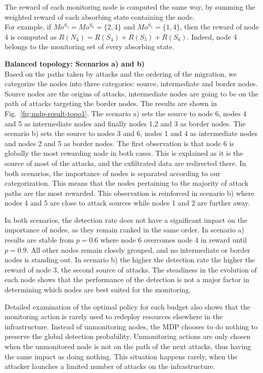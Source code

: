 The reward of each monitoring node is computed the same way, by summing the weighted reward of each absorbing state containing the node.\\
For example, if $Mo^{S_4} = Mo^{S_6} =\{2,4\}$ and $Mo^{S_5} = \{1,4\}$, then the reward of node 4 is computed as $R(N_4) = R(S_4) + R(S_5) + R(S_6)$. Indeed, node 4 belongs to the monitoring set of every absorbing state.



\textbf{Balanced topology: Scenarios a) and b)\\}
Based on the paths taken by attacks and the ordering of the migration, we categorize the nodes into three categories: source, intermediate and border nodes. Source nodes are the origins of attacks, intermediate nodes are going to be on the path of attacks targeting the border nodes. 
The results are shown in Fig.~\ref{fig:mdp-result-topo1}.
The scenario a) sets the source to node 6, nodes 4 and 5 as intermediate nodes and finally nodes 1,2 and 3 as border nodes.
The scenario b) sets the source to nodes 3 and 6, nodes 1 and 4 as intermediate nodes and nodes 2 and 5 as border nodes.
The first observation is that node 6 is globally the most rewarding node in both cases.
This is explained as it is the source of most of the attacks, and the exfiltrated data are redirected there.
In both scenarios, the importance of nodes is separated according to our categorization. 
This means that the nodes pertaining to the majority of attack paths are the most rewarded.
This observation is reinforced in scenario b) where nodes 4 and 5 are close to attack sources while nodes 1 and 2 are further away.

In both scenarios, the detection rate does not have a significant impact on the importance of nodes, as they remain ranked in the same order.
In scenario a) results are stable from $p=0.6$ where node 6 overcomes node 4 in reward until $p=0.9$. All other nodes remain closely grouped, and no intermediate or border nodes is standing out.
In scenario b) the higher the detection rate the higher the reward of node 3, the second source of attacks.
The steadiness in the evolution of each node shows that the performance of the detection is not a major factor in determining which nodes are best suited for the monitoring. 

Detailed examination of the optimal policy for each budget also shows that the monitoring action is rarely used to redeploy resources elsewhere in the infrastructure.
Instead of unmonitoring nodes, the MDP chooses to do nothing to preserve the global detection probability.
Unmonitoring actions are only chosen when the unmonitored node is not on the path of the next attacks, thus having the same impact as doing nothing. 
This situation happens rarely, when the attacker launches a limited number of attacks on the infrastructure.

